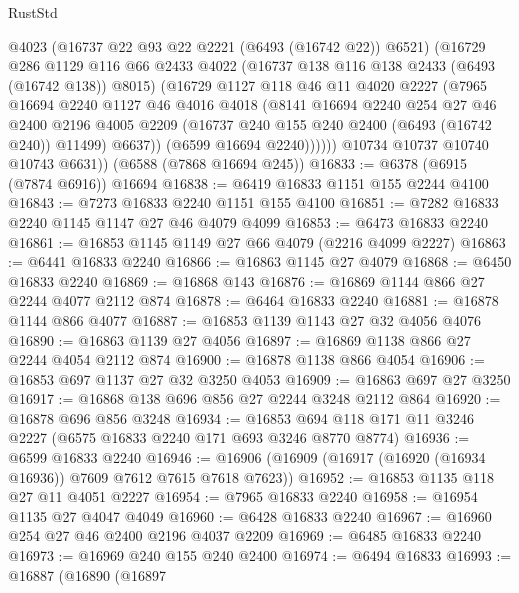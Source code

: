 \begin{lexlean}{RustStd}
\begin{coremodule}
              @4023
              (@16737 @22 @93 @22 @2221 (@6493 (@16742 @22)) @6521)
              (@16729
                @286
                @1129
                @116
                @66
                @2433
                @4022
                (@16737 @138 @116 @138 @2433 (@6493 (@16742 @138)) @8015)
                (@16729
                  @1127
                  @118
                  @46
                  @11
                  @4020
                  @2227
                  (@7965
                    @16694
                    @2240
                    @1127
                    @46
                    @4016
                    @4018
                    (@8141
                      @16694
                      @2240
                      @254
                      @27
                      @46
                      @2400
                      @2196
                      @4005
                      @2209
                      (@16737 @240 @155 @240 @2400 (@6493 (@16742 @240)) @11499)
                      @6637))
                  (@6599 @16694 @2240))))))
        @10734
        @10737
        @10740
        @10743
        @6631))
    (@6588 (@7868 @16694 @245))
@16833 := @6378 (@6915 (@7874 @6916)) @16694
@16838 := @6419 @16833 @1151 @155 @2244 @4100
@16843 := @7273 @16833 @2240 @1151 @155 @4100
@16851 := @7282 @16833 @2240 @1145 @1147 @27 @46 @4079 @4099
@16853 := @6473 @16833 @2240
@16861 := @16853 @1145 @1149 @27 @66 @4079 (@2216 @4099 @2227)
@16863 := @6441 @16833 @2240
@16866 := @16863 @1145 @27 @4079
@16868 := @6450 @16833 @2240
@16869 := @16868 @143
@16876 := @16869 @1144 @866 @27 @2244 @4077 @2112 @874
@16878 := @6464 @16833 @2240
@16881 := @16878 @1144 @866 @4077
@16887 := @16853 @1139 @1143 @27 @32 @4056 @4076
@16890 := @16863 @1139 @27 @4056
@16897 := @16869 @1138 @866 @27 @2244 @4054 @2112 @874
@16900 := @16878 @1138 @866 @4054
@16906 := @16853 @697 @1137 @27 @32 @3250 @4053
@16909 := @16863 @697 @27 @3250
@16917 := @16868 @138 @696 @856 @27 @2244 @3248 @2112 @864
@16920 := @16878 @696 @856 @3248
@16934 := @16853 @694 @118 @171 @11 @3246 @2227 (@6575 @16833 @2240 @171 @693 @3246 @8770 @8774)
@16936 := @6599 @16833 @2240
@16946 := @16906 (@16909 (@16917 (@16920 (@16934 @16936)) @7609 @7612 @7615 @7618 @7623))
@16952 := @16853 @1135 @118 @27 @11 @4051 @2227
@16954 := @7965 @16833 @2240
@16958 := @16954 @1135 @27 @4047 @4049
@16960 := @6428 @16833 @2240
@16967 := @16960 @254 @27 @46 @2400 @2196 @4037 @2209
@16969 := @6485 @16833 @2240
@16973 := @16969 @240 @155 @240 @2400
@16974 := @6494 @16833
@16993 := @16887
    (@16890
      (@16897

\end{coremodule}
\end{lexlean}
